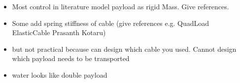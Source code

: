     \begin{itemize}
        \item Most control in literature model payload as rigid Mass. Give references.
        \item Some add spring stiffness of cable (give references e.g. QuadLoad ElasticCable Prasanth Kotaru)
        \item but not practical because can design which cable you used. Cannot design which payload needs to be transported
        \item water looks like double payload
    \end{itemize}



